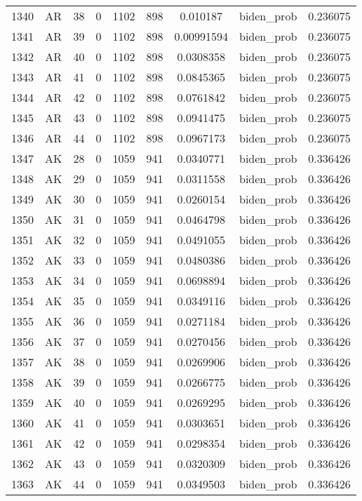 \documentclass[12pt,a4paper]{article}
\begin{document}
\begin{tabular}{r|cccccccc}
	1340 & AR & 38 & 0 & 1102 & 898 & 0.010187 & biden\_prob & 0.236075 \\
	1341 & AR & 39 & 0 & 1102 & 898 & 0.00991594 & biden\_prob & 0.236075 \\
	1342 & AR & 40 & 0 & 1102 & 898 & 0.0308358 & biden\_prob & 0.236075 \\
	1343 & AR & 41 & 0 & 1102 & 898 & 0.0845365 & biden\_prob & 0.236075 \\
	1344 & AR & 42 & 0 & 1102 & 898 & 0.0761842 & biden\_prob & 0.236075 \\
	1345 & AR & 43 & 0 & 1102 & 898 & 0.0941475 & biden\_prob & 0.236075 \\
	1346 & AR & 44 & 0 & 1102 & 898 & 0.0967173 & biden\_prob & 0.236075 \\
	1347 & AK & 28 & 0 & 1059 & 941 & 0.0340771 & biden\_prob & 0.336426 \\
	1348 & AK & 29 & 0 & 1059 & 941 & 0.0311558 & biden\_prob & 0.336426 \\
	1349 & AK & 30 & 0 & 1059 & 941 & 0.0260154 & biden\_prob & 0.336426 \\
	1350 & AK & 31 & 0 & 1059 & 941 & 0.0464798 & biden\_prob & 0.336426 \\
	1351 & AK & 32 & 0 & 1059 & 941 & 0.0491055 & biden\_prob & 0.336426 \\
	1352 & AK & 33 & 0 & 1059 & 941 & 0.0480386 & biden\_prob & 0.336426 \\
	1353 & AK & 34 & 0 & 1059 & 941 & 0.0698894 & biden\_prob & 0.336426 \\
	1354 & AK & 35 & 0 & 1059 & 941 & 0.0349116 & biden\_prob & 0.336426 \\
	1355 & AK & 36 & 0 & 1059 & 941 & 0.0271184 & biden\_prob & 0.336426 \\
	1356 & AK & 37 & 0 & 1059 & 941 & 0.0270456 & biden\_prob & 0.336426 \\
	1357 & AK & 38 & 0 & 1059 & 941 & 0.0269906 & biden\_prob & 0.336426 \\
	1358 & AK & 39 & 0 & 1059 & 941 & 0.0266775 & biden\_prob & 0.336426 \\
	1359 & AK & 40 & 0 & 1059 & 941 & 0.0269295 & biden\_prob & 0.336426 \\
	1360 & AK & 41 & 0 & 1059 & 941 & 0.0303651 & biden\_prob & 0.336426 \\
	1361 & AK & 42 & 0 & 1059 & 941 & 0.0298354 & biden\_prob & 0.336426 \\
	1362 & AK & 43 & 0 & 1059 & 941 & 0.0320309 & biden\_prob & 0.336426 \\
	1363 & AK & 44 & 0 & 1059 & 941 & 0.0349503 & biden\_prob & 0.336426 \\

\end{tabular}
\end{document}
